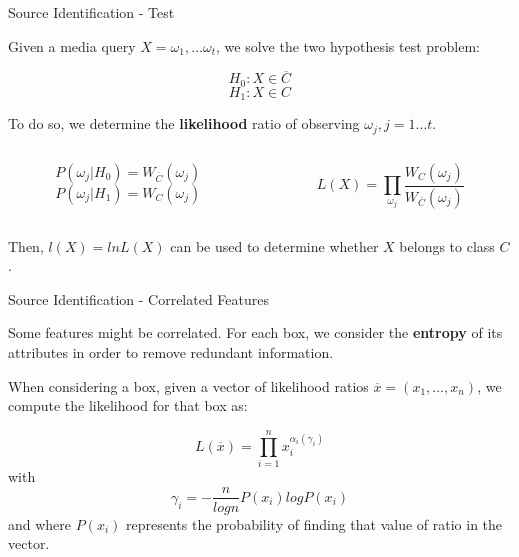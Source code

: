 \begin{tframe}{Source Identification - Test}

Given a media query $X = \omega_{1}, . . . \omega_{t}$, we solve the two hypothesis test problem:

$$  H_{0}:X \in \overline{C} $$
$$  H_{1}:X \in C $$

To do so, we determine the \textbf{likelihood} ratio of observing $\omega_{j}, j = 1 \ldots t$.

\vspace{1cm}

\begin{minipage}{\textwidth}
\begin{columns}[T]

\begin{column}{0.45\textwidth}
$$ P(\omega_{j}\vert H_{0}) = W_{\overline{C}}(\omega_{j}) $$
$$ P(\omega_{j}\vert H_{1}) = W_{C}(\omega_{j}) $$ 
\end{column}

\begin{column}{0.45\textwidth}
$$ L(X) = \prod\limits_{\omega_{j}}\dfrac{W_{C}(\omega_{j}) }{W_{\overline{C}}(\omega_{j})} $$
\end{column}

\end{columns}
\end{minipage}

\vspace{0.5cm}

Then, $l(X) = lnL(X)$ can be used to determine whether $X$ belongs to class $C$.

\end{tframe}

\begin{tframe}{Source Identification - Correlated Features}

Some features might be correlated. For each box, we consider the \textbf{entropy} of its attributes in order to remove redundant information.

\vspace{0.3cm}

When considering a box, given a vector of likelihood ratios $\overline{x} = (x_{1},\ldots,x_{n})$, we compute the likelihood for that box as:

$$ L(\overline{x}) = \prod\limits_{i=1}^{n} x_{i}^{\alpha_{i}(\gamma_{i})} $$ with  $$ \gamma_{i} = - \dfrac{n}{log n} P(x_{i})log P(x_{i}) $$ and where $P(x_{i})$ represents the probability of finding that value of ratio in the vector.

\end{tframe}

